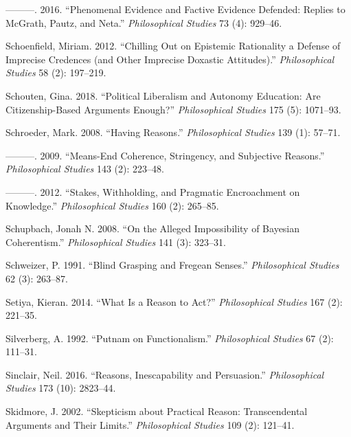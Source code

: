 \documentclass[
  10pt,
  letterpaper,
  DIV=11,
  numbers=noendperiod,
  twoside]{scrartcl}
\newlength{\cslhangindent}
\newenvironment{CSLReferences}[2] %
 {\begin{list}{}{%
  \setlength{\itemindent}{0pt}
  \setlength{\leftmargin}{0pt}
  \setlength{\parsep}{0pt}
  \ifodd #1
   \setlength{\leftmargin}{\cslhangindent}
   \setlength{\itemindent}{-1\cslhangindent}
  \fi
  \setlength{\itemsep}{#2\baselineskip}}}
 {\end{list}}
\begin{document}
\begin{CSLReferences}{1}{0}
---------. 2016. {``Phenomenal Evidence and Factive Evidence Defended:
Replies to McGrath, Pautz, and Neta.''} \emph{Philosophical Studies} 73
(4): 929--46.

Schoenfield, Miriam. 2012. {``Chilling Out on Epistemic Rationality a
Defense of Imprecise Credences (and Other Imprecise Doxastic
Attitudes).''} \emph{Philosophical Studies} 58 (2): 197--219.

Schouten, Gina. 2018. {``Political Liberalism and Autonomy Education:
Are Citizenship-Based Arguments Enough?''} \emph{Philosophical Studies}
175 (5): 1071--93.

Schroeder, Mark. 2008. {``Having Reasons.''} \emph{Philosophical
Studies} 139 (1): 57--71.

---------. 2009. {``Means-End Coherence, Stringency, and Subjective
Reasons.''} \emph{Philosophical Studies} 143 (2): 223--48.

---------. 2012. {``Stakes, Withholding, and Pragmatic Encroachment on
Knowledge.''} \emph{Philosophical Studies} 160 (2): 265--85.

Schupbach, Jonah N. 2008. {``On the Alleged Impossibility of Bayesian
Coherentism.''} \emph{Philosophical Studies} 141 (3): 323--31.

Schweizer, P. 1991. {``Blind Grasping and Fregean Senses.''}
\emph{Philosophical Studies} 62 (3): 263--87.

Setiya, Kieran. 2014. {``What Is a Reason to Act?''} \emph{Philosophical
Studies} 167 (2): 221--35.

Silverberg, A. 1992. {``Putnam on Functionalism.''} \emph{Philosophical
Studies} 67 (2): 111--31.

Sinclair, Neil. 2016. {``Reasons, Inescapability and Persuasion.''}
\emph{Philosophical Studies} 173 (10): 2823--44.

Skidmore, J. 2002. {``Skepticism about Practical Reason: Transcendental
Arguments and Their Limits.''} \emph{Philosophical Studies} 109 (2):
121--41.


\end{CSLReferences}
\end{document}
